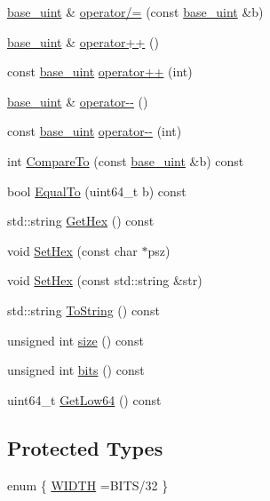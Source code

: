 \begin{DoxyCompactItemize}
\item 
\mbox{\hyperlink{classbase__uint}{base\+\_\+uint}} \& \mbox{\hyperlink{classbase__uint_ad6fa7e22ab995247c0bf298069732e1d}{operator/=}} (const \mbox{\hyperlink{classbase__uint}{base\+\_\+uint}} \&b)
\item 
\mbox{\hyperlink{classbase__uint}{base\+\_\+uint}} \& \mbox{\hyperlink{classbase__uint_a56b54869886808961092d3f764fadd9f}{operator++}} ()
\item 
const \mbox{\hyperlink{classbase__uint}{base\+\_\+uint}} \mbox{\hyperlink{classbase__uint_a2d5a123c856b2b31fae5f65891832486}{operator++}} (int)
\item 
\mbox{\hyperlink{classbase__uint}{base\+\_\+uint}} \& \mbox{\hyperlink{classbase__uint_a2cc581d32afac619acd12601ddea4180}{operator-\/-\/}} ()
\item 
const \mbox{\hyperlink{classbase__uint}{base\+\_\+uint}} \mbox{\hyperlink{classbase__uint_a78a8e46c434c0e61be86282fe9543587}{operator-\/-\/}} (int)
\item 
int \mbox{\hyperlink{classbase__uint_a1196e0ff823836958e45aec3a246b9d2}{Compare\+To}} (const \mbox{\hyperlink{classbase__uint}{base\+\_\+uint}} \&b) const
\item 
bool \mbox{\hyperlink{classbase__uint_aaba2c27863f6d5077ed21cd353766168}{Equal\+To}} (uint64\+\_\+t b) const
\item 
std\+::string \mbox{\hyperlink{classbase__uint_ae5e7b7481de91ebead20eebd5d685441}{Get\+Hex}} () const
\item 
void \mbox{\hyperlink{classbase__uint_ade1a897fac931f28f54998c92c797228}{Set\+Hex}} (const char $\ast$psz)
\item 
void \mbox{\hyperlink{classbase__uint_afe3600e6ae4e9f69e1c036581a2716c8}{Set\+Hex}} (const std\+::string \&str)
\item 
std\+::string \mbox{\hyperlink{classbase__uint_acccba4d9d51a0c36261718ca0cbb293b}{To\+String}} () const
\item 
unsigned int \mbox{\hyperlink{classbase__uint_a1f49b034e686269601ea89b0319b8004}{size}} () const
\item 
unsigned int \mbox{\hyperlink{classbase__uint_afe1eacc0b592cf184ac8ee0446997fbe}{bits}} () const
\item 
uint64\+\_\+t \mbox{\hyperlink{classbase__uint_ad8dbf3216dd15a64f1598344ad7a71ea}{Get\+Low64}} () const
\end{DoxyCompactItemize}
\subsection*{Protected Types}
\begin{DoxyCompactItemize}
\item 
enum \{ \mbox{\hyperlink{classbase__uint_afee51629f03ba95d823ab4ee94cf6c81adf579395d753e2d9607ecd61424f0853}{W\+I\+D\+TH}} =B\+I\+T\+S/32
 \}
\end{DoxyCompactItemize}
